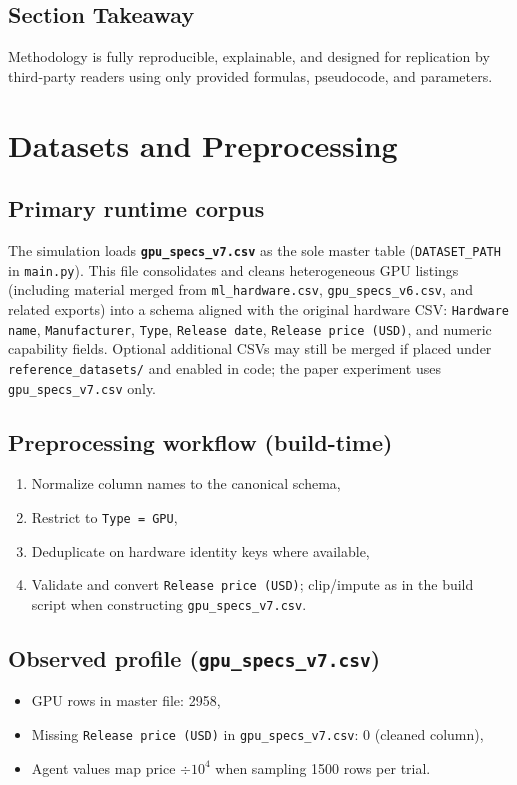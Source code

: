 \documentclass[journal]{IEEEtran}
\begin{document}
\subsection{Section Takeaway}
Methodology is fully reproducible, explainable, and designed for replication by third-party readers using only provided formulas, pseudocode, and parameters.

\section{Datasets and Preprocessing}
\subsection{Primary runtime corpus}
The simulation loads \textbf{\texttt{gpu\_specs\_v7.csv}} as the sole master table (\texttt{DATASET\_PATH} in \texttt{main.py}). This file consolidates and cleans heterogeneous GPU listings (including material merged from \texttt{ml\_hardware.csv}, \texttt{gpu\_specs\_v6.csv}, and related exports) into a schema aligned with the original hardware CSV: \texttt{Hardware name}, \texttt{Manufacturer}, \texttt{Type}, \texttt{Release date}, \texttt{Release price (USD)}, and numeric capability fields. Optional additional CSVs may still be merged if placed under \texttt{reference\_datasets/} and enabled in code; the paper experiment uses \texttt{gpu\_specs\_v7.csv} only.

\subsection{Preprocessing workflow (build-time)}
\begin{enumerate}[leftmargin=*]
    \item Normalize column names to the canonical schema,
    \item Restrict to \texttt{Type = GPU},
    \item Deduplicate on hardware identity keys where available,
    \item Validate and convert \texttt{Release price (USD)}; clip/impute as in the build script when constructing \texttt{gpu\_specs\_v7.csv}.
\end{enumerate}

\subsection{Observed profile (\texttt{gpu\_specs\_v7.csv})}
\begin{itemize}[leftmargin=*]
    \item GPU rows in master file: 2958,
    \item Missing \texttt{Release price (USD)} in \texttt{gpu\_specs\_v7.csv}: 0 (cleaned column),
    \item Agent values map price $\div 10^4$ when sampling 1500 rows per trial.
\end{itemize}
\end{document}
